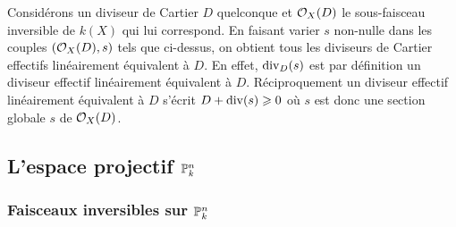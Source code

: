 Considérons un diviseur de Cartier $D$ quelconque et $\mathcal{O}_X(D)$ le sous-faisceau inversible de $k(X)$ qui lui correspond. En faisant varier $s$ non-nulle dans les couples $(\mathcal{O}_X(D),s)$ tels que ci-dessus, on obtient tous les diviseurs de Cartier effectifs linéairement équivalent à $D$. En effet, $\operatorname{div}_D(s)$ est par définition un diviseur effectif linéairement équivalent à $D$. Réciproquement un diviseur effectif linéairement équivalent à $D$ s'écrit $D+\operatorname{div}(s)\geqslant 0$ où $s$ est donc une section globale $s$ de $\mathcal{O}_X(D)$.

\subsection{L'espace projectif $\mathbb{P}_k^n$}

\subsubsection{Faisceaux inversibles sur $\mathbb{P}_k^n$}

